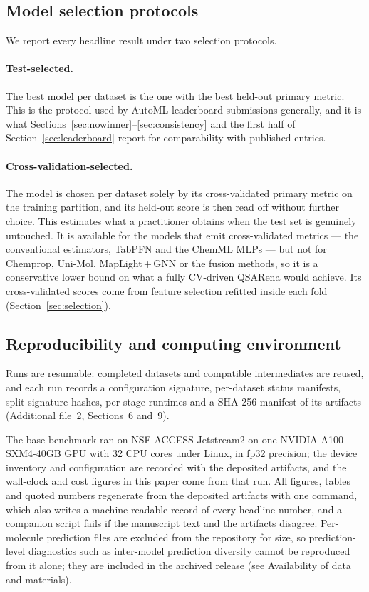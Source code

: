 \subsection{Model selection protocols}\label{sec:protocols}

We report every headline result under two selection protocols.

\paragraph{Test-selected.} The best model per dataset is the one with the best held-out primary metric. This is the protocol used by AutoML leaderboard submissions generally, and it is what Sections~\ref{sec:nowinner}--\ref{sec:consistency} and the first half of Section~\ref{sec:leaderboard} report for comparability with published entries.

\paragraph{Cross-validation-selected.} The model is chosen per dataset solely by its cross-validated primary metric on the training partition, and its held-out score is then read off without further choice. This estimates what a practitioner obtains when the test set is genuinely untouched. It is available for the models that emit cross-validated metrics --- the conventional estimators, TabPFN and the ChemML MLPs --- but not for Chemprop, Uni-Mol, MapLight\,+\,GNN or the fusion methods, so it is a conservative lower bound on what a fully CV-driven QSARena would achieve. Its cross-validated scores come from feature selection refitted inside each fold (Section~\ref{sec:selection}).

\subsection{Reproducibility and computing environment}\label{sec:environment}

Runs are resumable: completed datasets and compatible intermediates are reused, and each run records a configuration signature, per-dataset status manifests, split-signature hashes, per-stage runtimes and a SHA-256 manifest of its artifacts (Additional file~2, Sections~6 and~9).

The base benchmark ran on NSF ACCESS Jetstream2 \cite{hancock2021jetstream2,boerner2023access} on one NVIDIA A100-SXM4-40GB GPU with 32 CPU cores under Linux, in fp32 precision; the device inventory and configuration are recorded with the deposited artifacts, and the wall-clock and cost figures in this paper come from that run. All figures, tables and quoted numbers regenerate from the deposited artifacts with one command, which also writes a machine-readable record of every headline number, and a companion script fails if the manuscript text and the artifacts disagree. Per-molecule prediction files are excluded from the repository for size, so prediction-level diagnostics such as inter-model prediction diversity cannot be reproduced from it alone; they are included in the archived release (see Availability of data and materials).

